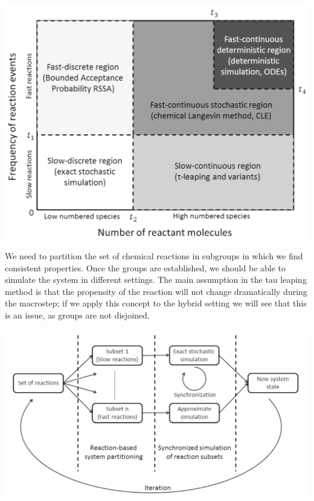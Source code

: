\includegraphics{regions.png}

We need to partition the set of chemical reactions in subgroups in which we find consistent properties.
Once the groups are established, we should be able to simulate the system in different settings.
The main assumption in the tau leaping method is that the propensity of the reaction will not change dramatically during the macrostep; if we apply this concept to the hybrid setting we will see that this is an issue, as groups are not disjoined.

\includegraphics{scheme.png}

